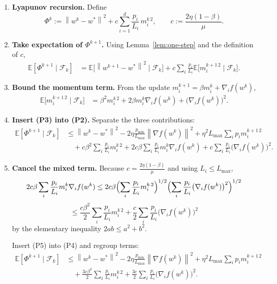 \documentclass{article}
\newcommand{\E}{\mathbb{E}}
\newcommand{\norm}[1]{\left\lVert#1\right\rVert}
\begin{document}
\begin{enumerate}
\item[Step 1.] \textbf{Lyapunov recursion.}  
Define 
\[
\Phi^{k}:=\norm{w^{k}-w^{*}}^{2}+c\sum_{i=1}^{d}\frac{p_i}{L_i}\,m_{i}^{k\,2},
\qquad c:=\frac{2\eta(1-\beta)}{\mu}.
\tag{P1}
\]

\item[Step 2.] \textbf{Take expectation of $\Phi^{k+1}$.}  
Using Lemma~\ref{lem:one-step} and the definition of $c$,
\[
\begin{aligned}
\E[\Phi^{k+1}\mid\mathcal{F}_{k}]
&=\E\!\bigl[\norm{w^{k+1}-w^{*}}^{2}\mid\mathcal{F}_{k}\bigr]
+ c\sum_{i}\frac{p_i}{L_i}\E\!\bigl[m_{i}^{k+1\,2}\mid\mathcal{F}_{k}\bigr] .
\end{aligned}
\tag{P2}
\]

\item[Step 3.] \textbf{Bound the momentum term.}  
From the update $m_{i}^{k+1}= \beta m_{i}^{k}+ \nabla_i f(w^{k})$,
\[
\begin{aligned}
\E\!\bigl[m_{i}^{k+1\,2}\mid\mathcal{F}_{k}\bigr]
&= \beta^{2} m_{i}^{k\,2}+2\beta m_{i}^{k}\nabla_i f(w^{k})+ \bigl(\nabla_i f(w^{k})\bigr)^{2}.
\end{aligned}
\tag{P3}
\]

\item[Step 4.] \textbf{Insert (P3) into (P2).}  
Separate the three contributions:
\[
\begin{aligned}
\E[\Phi^{k+1}\mid\mathcal{F}_{k}]
&\le \norm{w^{k}-w^{*}}^{2}
-2\eta\frac{p_{\min}}{L_{\max}}\norm{\nabla f(w^{k})}^{2}
+\eta^{2}L_{\max}\sum_{i}p_i m_{i}^{k+1\,2} \\
&\quad +c\beta^{2}\sum_{i}\frac{p_i}{L_i}m_{i}^{k\,2}
+2c\beta\sum_{i}\frac{p_i}{L_i}m_{i}^{k}\nabla_i f(w^{k})
+c\sum_{i}\frac{p_i}{L_i}\bigl(\nabla_i f(w^{k})\bigr)^{2}.
\end{aligned}
\tag{P4}
\]

\item[Step 5.] \textbf{Cancel the mixed term.}  
Because $c= \frac{2\eta(1-\beta)}{\mu}$ and using $L_i\le L_{\max}$,
\[
2c\beta\sum_{i}\frac{p_i}{L_i}m_{i}^{k}\nabla_i f(w^{k})
\le 2c\beta\Bigl(\sum_{i}\frac{p_i}{L_i}m_{i}^{k\,2}\Bigr)^{1/2}
\Bigl(\sum_{i}\frac{p_i}{L_i}\bigl(\nabla_i f(w^{k})\bigr)^{2}\Bigr)^{1/2}
\]
\[
\le \frac{c\beta^{2}}{2}\sum_{i}\frac{p_i}{L_i}m_{i}^{k\,2}
+ \frac{c}{2}\sum_{i}\frac{p_i}{L_i}\bigl(\nabla_i f(w^{k})\bigr)^{2}
\tag{P5}
\]
by the elementary inequality $2ab\le a^{2}+b^{2}$.  

Insert (P5) into (P4) and regroup terms:
\[
\begin{aligned}
\E[\Phi^{k+1}\mid\mathcal{F}_{k}]
&\le \norm{w^{k}-w^{*}}^{2}
-2\eta\frac{p_{\min}}{L_{\max}}\norm{\nabla f(w^{k})}^{2}
+\eta^{2}L_{\max}\sum_{i}p_i m_{i}^{k+1\,2}\\
&\quad +\frac{3c\beta^{2}}{2}\sum_{i}\frac{p_i}{L_i}m_{i}^{k\,2}
+\frac{3c}{2}\sum_{i}\frac{p_i}{L_i}\bigl(\nabla_i f(w^{k})\bigr)^{2}.
\end{aligned}
\tag{P6}
\]


\end{enumerate}
\end{document}
